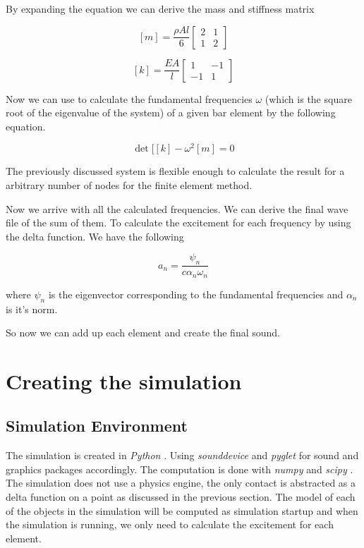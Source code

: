 \documentclass[11pt]{article}
\begin{document}
By expanding the equation we can derive the mass and stiffness matrix

$$[m] = \frac{\rho A l}{6} \begin{bmatrix} 2 & 1 \\ 1 & 2\end{bmatrix}$$

$$[k] = \frac{EA}{l} \begin{bmatrix} 1 & -1 \\ -1 & 1 \end{bmatrix}$$

Now we can use to calculate the fundamental frequencies $\omega$ (which is the square root of the eigenvalue of the system) of a given bar element by the following equation.

$$\det[[k] - \omega^2[m] = 0 $$

The previously discussed system is flexible enough to calculate the result for a arbitrary number of nodes for the finite element method.

Now we arrive with all the calculated frequencies. We can derive the final wave file of the sum of them. To calculate the excitement for each frequency by using the delta function. We have the following

$$a_n = \frac{\psi_n}{c \alpha_n \omega_n}$$

where $\psi_n$ is the eigenvector corresponding to the fundamental frequencies and $\alpha_n$ is it's norm.

So now we can add up each element and create the final sound.

\section*{Creating the simulation}
\subsection*{Simulation Environment}
The simulation is created in \textit{Python} \cite{python}. Using \textit{sounddevice} \cite{sd} and \textit{pyglet} \cite{pyglet} for sound and graphics packages accordingly. The computation is done with \textit{numpy} \cite{np} and \textit{scipy} \cite{scipy}. The simulation does not use a physics engine, the only contact is abstracted as a delta function on a point as discussed in the previous section. The model of each of the objects in the simulation will be computed as simulation startup and when the simulation is running, we only need to calculate the excitement for each element.
\end{document}
